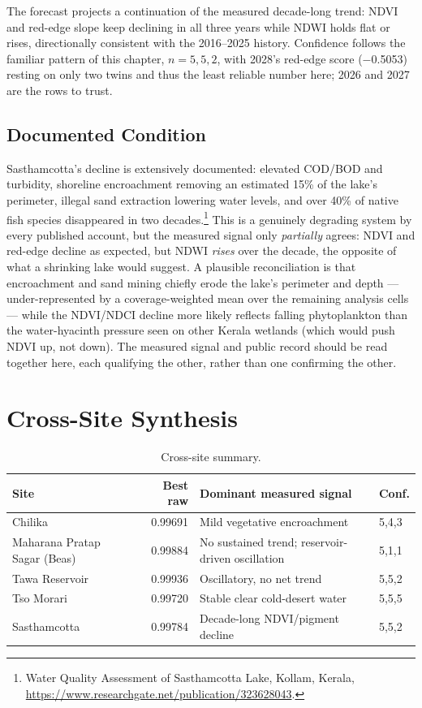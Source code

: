 \documentclass[12pt,a4paper,oneside]{report}
\begin{document}
The forecast projects a continuation of the measured decade-long
trend: NDVI and red-edge slope keep declining in all three years
while NDWI holds flat or rises, directionally consistent with the
2016--2025 history. Confidence follows the familiar pattern of this
chapter, $n=5,5,2$, with 2028's red-edge score ($-$0.5053) resting on
only two twins and thus the least reliable number here; 2026 and
2027 are the rows to trust.

\subsection{Documented Condition}

Sasthamcotta's decline is extensively documented: elevated COD/BOD
and turbidity, shoreline encroachment removing an estimated 15\% of
the lake's perimeter, illegal sand extraction lowering water levels,
and over 40\% of native fish species disappeared in two
decades.\footnote{Water Quality Assessment of Sasthamcotta Lake,
Kollam, Kerala, \url{https://www.researchgate.net/publication/323628043}.}
This is a genuinely degrading system by every published account, but
the measured signal only \emph{partially} agrees: NDVI and red-edge
decline as expected, but NDWI \emph{rises} over the decade, the
opposite of what a shrinking lake would suggest. A plausible
reconciliation is that encroachment and sand mining chiefly erode
the lake's perimeter and depth --- under-represented by a
coverage-weighted mean over the remaining analysis cells --- while
the NDVI/NDCI decline more likely reflects falling phytoplankton
than the water-hyacinth pressure seen on other Kerala wetlands
(which would push NDVI up, not down). The measured signal and public
record should be read together here, each qualifying the other,
rather than one confirming the other.

\section{Cross-Site Synthesis}

\begin{table}[H]
\centering
\caption{Cross-site summary.}
\label{tab:ramsar_summary}
\begin{tabularx}{\textwidth}{l r X l}
\toprule
Site & Best raw & Dominant measured signal & Conf. \\
\midrule
Chilika & 0.99691 & Mild vegetative encroachment & 5,4,3 \\
Maharana Pratap Sagar (Beas) & 0.99884 & No sustained trend; reservoir-driven oscillation & 5,1,1 \\
Tawa Reservoir & 0.99936 & Oscillatory, no net trend & 5,5,2 \\
Tso Morari & 0.99720 & Stable clear cold-desert water & 5,5,5 \\
Sasthamcotta & 0.99784 & Decade-long NDVI/pigment decline & 5,5,2 \\
\bottomrule
\end{tabularx}
\end{table}
\end{document}
